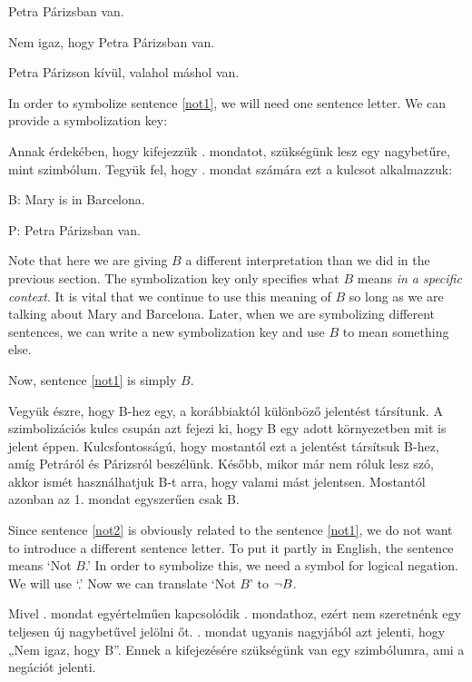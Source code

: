 \begin{earg}
\item[\ex{not1}] Petra Párizsban van.
\item[\ex{not2}] Nem igaz, hogy Petra Párizsban van.
\item[\ex{not3}] Petra Párizson kívül, valahol máshol van.
\end{earg}

In order to symbolize sentence \ref{not1}, we will need one sentence letter. We can provide a symbolization key:

Annak érdekében, hogy kifejezzük . mondatot, szükségünk lesz egy nagybetűre, mint szimbólum.
Tegyük fel, hogy . mondat számára ezt a kulcsot alkalmazzuk:
\begin{ekey}
\item[B:]Mary is in Barcelona.
\end{ekey}

\begin{ekey}
\item[P:]Petra Párizsban van.
\end{ekey}

Note that here we are giving $B$ a different interpretation than we did in the previous section. The symbolization key only specifies what $B$ means \emph{in a specific context}. It is vital that we continue to use this meaning of $B$ so long as we are talking about Mary and Barcelona. Later, when we are symbolizing different sentences, we can write a new symbolization key and use $B$ to mean something else.

Now, sentence \ref{not1} is simply $B$. 

Vegyük észre, hogy B-hez egy, a korábbiaktól különböző jelentést társítunk. A szimbolizációs kulcs csupán azt fejezi ki, hogy B egy adott környezetben mit is jelent éppen.
Kulcsfontosságú, hogy mostantól ezt a jelentést társítsuk B-hez, amíg Petráról és Párizsról beszélünk. Később, mikor már nem róluk lesz szó, akkor ismét használhatjuk B-t arra, hogy valami mást jelentsen. Mostantól azonban az 1. mondat egyszerűen csak B.

Since sentence \ref{not2} is obviously related to the sentence \ref{not1}, we do not want to introduce a different sentence letter. To put it partly in English, the sentence means `Not $B$.' In order to symbolize this, we need a symbol for logical negation. We will use `\enot.' Now we can translate `Not $B$' to $\neg B$.

Mivel . mondat egyértelműen kapcsolódik . mondathoz, ezért nem szeretnénk egy teljesen új nagybetűvel jelölni őt.
. mondat ugyanis nagyjából azt jelenti, hogy „Nem igaz, hogy B”.
Ennek a kifejezésére szükségünk van egy szimbólumra, ami a negációt jelenti.

